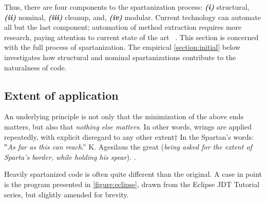 Thus, there are four components to the spartanization process:
\emph{\textbf{(i)}} structural,
\emph{\textbf{(ii)}} nominal,
\emph{\textbf{(iii)}} cleanup, and,
\emph{\textbf{(iv)}} modular.
Current technology can automate all but the last component;
automation of method extraction requires more research,
paying attention to current state of the art \matteo~\cite{
    we should have many citations
    somewhere can you please add some citations
}.
This section is concerned with the full process of spartanization. 
The empirical \cref{section:initial} below investigates how structural and
nominal spartanizations contribute to the naturalness of code.

\subsection{Extent of application}
\label{section:extent}
An underlying principle is not only that the minimization of
the above ends matters, but also that \emph{nothing else matters}.
In other words, wrings are applied repeatedly, with explicit disregard
to any other extent†{%
  In the Spartan's words: ‟\textit{As far as this can reach}.” K. Agesilaus the
  great (\textsl{being asked for the extent of Sparta's border, while
  holding his spear}).
}.

Heavily spartanized code is often quite different than the original. A case in
point is the \Java program presented in \cref{figure:eclipse}, drawn from the
Eclipse JDT Tutorial series,
but slightly amended for brevity.

